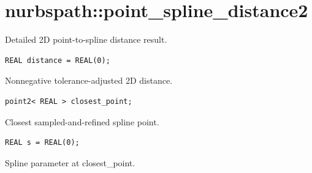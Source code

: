 \section{nurbspath::point\_spline\_distance2}
Detailed 2D point-to-spline distance result.
\par\noindent\begin{minipage}{\linewidth}
\begin{lstlisting}[style=apireference]
REAL distance = REAL(0);
\end{lstlisting}
{\footnotesize Nonnegative tolerance-adjusted 2D distance.\par}
\end{minipage}\par\vspace{1pt}
\par\noindent\begin{minipage}{\linewidth}
\begin{lstlisting}[style=apireference]
point2< REAL > closest_point;
\end{lstlisting}
{\footnotesize Closest sampled-and-refined spline point.\par}
\end{minipage}\par\vspace{1pt}
\par\noindent\begin{minipage}{\linewidth}
\begin{lstlisting}[style=apireference]
REAL s = REAL(0);
\end{lstlisting}
{\footnotesize Spline parameter at closest\_point.\par}
\end{minipage}\par\vspace{1pt}
